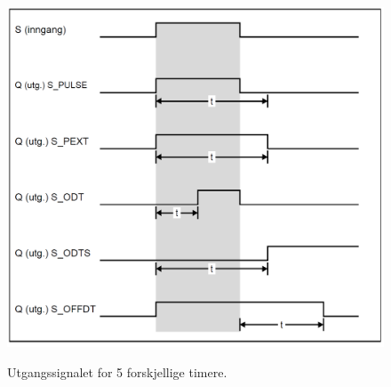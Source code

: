 \begin{figure}[ht]
    \centering
    \includegraphics[scale=0.775]{figures/test.PNG}
    \label{fig:timere}
    \caption{Utgangssignalet for 5 forskjellige timere.}
\end{figure}

